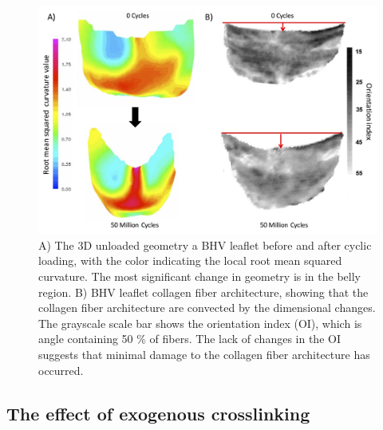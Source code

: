 \begin{figure}[hbt]
\centering
\includegraphics[width=\textwidth]{Images/chapter4/figure1}
\caption{A) The 3D unloaded geometry a BHV leaflet before and after cyclic loading, with the color indicating the local root mean squared curvature. The most significant change in geometry is in the belly region. B) BHV leaflet collagen fiber architecture, showing that the collagen fiber architecture are convected by the dimensional changes. The grayscale scale bar shows the orientation index (OI), which is angle containing 50 \% of fibers. The lack of changes in the OI suggests that minimal damage to the collagen fiber architecture has occurred.}
\label{fig:PSeffects}
\end{figure}



\subsection{The effect of exogenous crosslinking}

